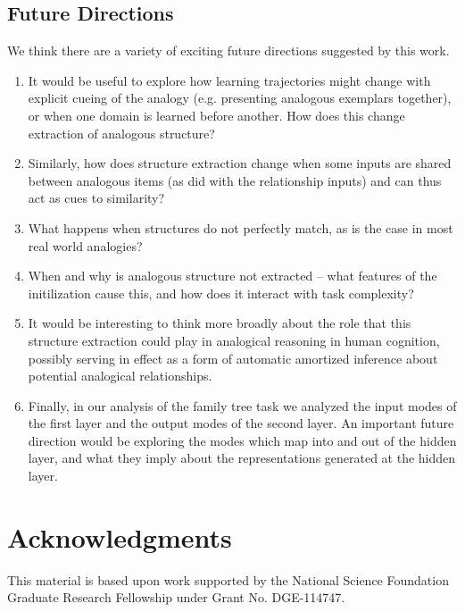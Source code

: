 \documentclass[10pt,letterpaper]{article}
\begin{document}
\subsection{Future Directions}
We think there are a variety of exciting future directions suggested by this work. 
\begin{enumerate}
\item It would be useful to explore how learning trajectories might change with explicit cueing of the analogy (e.g. presenting analogous exemplars together), or when one domain is learned before another. How does this change extraction of analogous structure?
\item Similarly, how does structure extraction change when some inputs are shared between analogous items (as \citet{Hinton1986} did with the relationship inputs) and can thus act as cues to similarity?
\item What happens when structures do not perfectly match, as is the case in most real world analogies?
\item When and why is analogous structure not extracted -- what features of the initilization cause this, and how does it interact with task complexity?
\item It would be interesting to think more broadly about the role that this structure extraction could play in analogical reasoning in human cognition, possibly serving in effect as a form of automatic amortized inference about potential analogical relationships.
\item Finally, in our analysis of the family tree task we analyzed the input modes of the first layer and the output modes of the second layer. An important future direction would be exploring the modes which map into and out of the hidden layer, and what they imply about the representations generated at the hidden layer.  
\end{enumerate}
\section{Acknowledgments}
This material is based upon work supported by the National Science Foundation Graduate Research Fellowship under Grant No. DGE-114747.


\setlength{\bibleftmargin}{.125in}
\setlength{\bibindent}{-\bibleftmargin}


\end{document}
